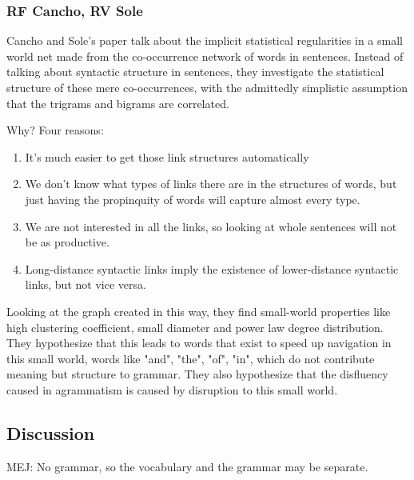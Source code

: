 \documentclass[12pt]{article}
\begin{document}
\subsubsection{RF Cancho, RV Sole}
Cancho and Sole's paper talk about the implicit statistical regularities in a small world net made from the co-occurrence network of words in sentences. Instead of talking about syntactic structure in sentences, they investigate the statistical structure of these mere co-occurrences, with the admittedly simplistic assumption that the trigrams and bigrams are correlated.

Why? Four reasons:

\begin{enumerate}
  \item It's much easier to get those link structures automatically
  \item We don't know what types of links there are in the structures of words, but just having the propinquity of words will capture almost every type. %
  \item We are not interested in all the links, so looking at whole sentences will not be as productive.
  \item Long-distance syntactic links imply the existence of lower-distance syntactic links, but not vice versa. %
\end{enumerate}

Looking at the graph created in this way, they find small-world properties like high clustering coefficient, small diameter and power law degree distribution. They hypothesize that this leads to words that exist to speed up navigation in this small world, words like "and", "the", "of", "in", which do not contribute meaning but structure to grammar. They also hypothesize that the disfluency caused in agrammatism is caused by disruption to this small world.


\subsection{Discussion} %
MEJ: No grammar, so the vocabulary and the grammar may be separate.
\end{document}
